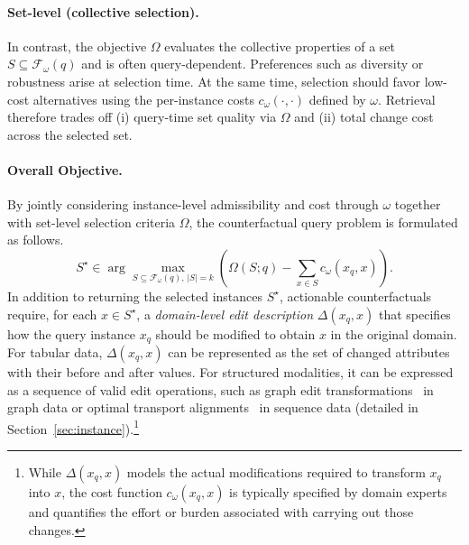 \paragraph{Set-level (collective selection).}
In contrast, the objective $\Omega$ evaluates the collective properties of a set $S\subseteq\mathcal F_\omega(q)$ and is often query-dependent. Preferences such as diversity or robustness arise at selection time. At the same time, selection should favor low-cost alternatives using the per-instance costs $c_\omega(\cdot,\cdot)$ defined by $\omega$. Retrieval therefore trades off (i) query-time set quality via $\Omega$ and (ii) total change cost across the selected set.

\paragraph{Overall Objective.}
By jointly considering instance-level admissibility and cost through $\omega$ together with set-level selection criteria $\Omega$, the counterfactual query problem is formulated as follows.
\begingroup\small
\begin{equation}
S^\star \in 
\arg\max_{S\subseteq \mathcal F_\omega(q),\, |S|=k}
\left(\Omega(S;q) - \sum_{x\in S} c_\omega(x_q,x)\right).
\label{eqn:objective}
\end{equation}
\endgroup
In addition to returning the selected instances $S^\star$, actionable counterfactuals require, for each $x \in S^\star$, a \emph{domain-level edit description} $\Delta(x_q, x)$ that specifies how the query instance $x_q$ should be modified to obtain $x$ in the original domain. For tabular data, $\Delta(x_q, x)$ can be represented as the set of changed attributes with their before and after values. For structured modalities, it can be expressed as a sequence of valid edit operations, such as graph edit transformations~\cite{gao2010survey} in graph data or optimal transport alignments~\cite{charpentier2023optimal} in sequence data (detailed in Section~\ref{sec:instance}).\footnote{While $\Delta(x_q, x)$ models the actual modifications required to transform $x_q$ into $x$, the cost function $c_\omega(x_q, x)$ is typically specified by domain experts and quantifies the effort or burden associated with carrying out those changes.} 


